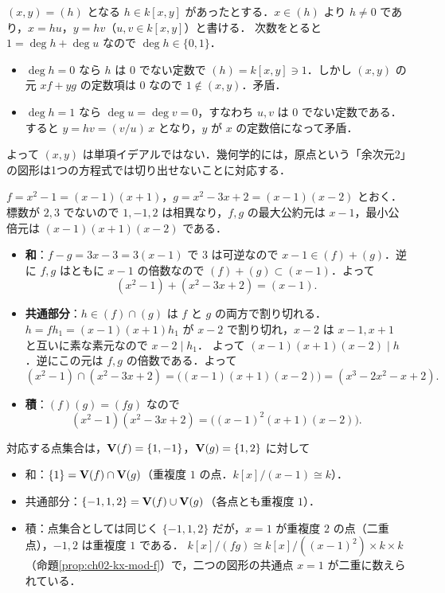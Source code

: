 $(x,y)=(h)$ となる $h\in k[x,y]$ があったとする．$x\in(h)$ より $h\ne0$ であり，$x=hu$，$y=hv$（$u,v\in k[x,y]$）と書ける．
次数をとると $1=\deg h+\deg u$ なので $\deg h\in\{0,1\}$．
\begin{itemize}
  \item $\deg h=0$ なら $h$ は $0$ でない定数で $(h)=k[x,y]\ni1$．しかし $(x,y)$ の元 $xf+yg$ の定数項は $0$ なので $1\notin(x,y)$．矛盾．
  \item $\deg h=1$ なら $\deg u=\deg v=0$，すなわち $u,v$ は $0$ でない定数である．すると $y=hv=(v/u)\,x$ となり，$y$ が $x$ の定数倍になって矛盾．
\end{itemize}
よって $(x,y)$ は単項イデアルではない．幾何学的には，原点という「余次元2」の図形は1つの方程式では切り出せないことに対応する．

$f=x^2-1=(x-1)(x+1)$，$g=x^2-3x+2=(x-1)(x-2)$ とおく．標数が $2,3$ でないので $1,-1,2$ は相異なり，$f,g$ の最大公約元は $x-1$，最小公倍元は $(x-1)(x+1)(x-2)$ である．
\begin{itemize}
  \item \textbf{和}：$f-g=3x-3=3(x-1)$ で $3$ は可逆なので $x-1\in(f)+(g)$．逆に $f,g$ はともに $x-1$ の倍数なので $(f)+(g)\subset(x-1)$．よって
        \[ (x^2-1)+(x^2-3x+2)=(x-1). \]
  \item \textbf{共通部分}：$h\in(f)\cap(g)$ は $f$ と $g$ の両方で割り切れる．$h=fh_1=(x-1)(x+1)h_1$ が $x-2$ で割り切れ，$x-2$ は $x-1,x+1$ と互いに素な素元なので $x-2\mid h_1$．
        よって $(x-1)(x+1)(x-2)\mid h$．逆にこの元は $f,g$ の倍数である．よって
        \[ (x^2-1)\cap(x^2-3x+2)=\bigl((x-1)(x+1)(x-2)\bigr)=(x^3-2x^2-x+2). \]
  \item \textbf{積}：$(f)(g)=(fg)$ なので
        \[ (x^2-1)(x^2-3x+2)=\bigl((x-1)^2(x+1)(x-2)\bigr). \]
\end{itemize}
対応する点集合は，$\mathbf{V}(f)=\{1,-1\}$，$\mathbf{V}(g)=\{1,2\}$ に対して
\begin{itemize}
  \item 和：$\{1\}=\mathbf{V}(f)\cap\mathbf{V}(g)$（重複度 $1$ の点．$k[x]/(x-1)\cong k$）．
  \item 共通部分：$\{-1,1,2\}=\mathbf{V}(f)\cup\mathbf{V}(g)$（各点とも重複度 $1$）．
  \item 積：点集合としては同じく $\{-1,1,2\}$ だが，$x=1$ が重複度 $2$ の点（二重点），$-1,2$ は重複度 $1$ である．
        $k[x]/(fg)\cong k[x]/((x-1)^2)\times k\times k$（命題\ref{prop:ch02-kx-mod-f}）で，二つの図形の共通点 $x=1$ が二重に数えられている．
\end{itemize}

